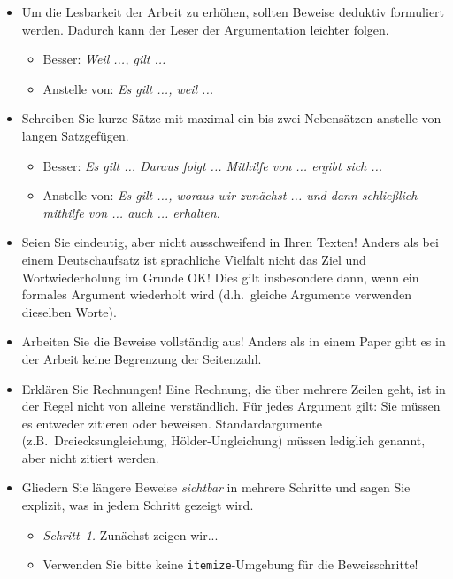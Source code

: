 \documentclass[../template_diplom.tex]{subfiles}
\begin{document}
\begin{itemize}

  \item Um die Lesbarkeit der Arbeit zu erhöhen, sollten Beweise deduktiv formuliert werden. Dadurch kann der Leser der Argumentation leichter folgen.
        \begin{itemize}
          \item Besser: \emph{Weil ..., gilt ...}
          \item Anstelle von: \emph{Es gilt ..., weil ...}
        \end{itemize}

  \item Schreiben Sie kurze Sätze mit maximal ein bis zwei Nebensätzen anstelle von langen Satzgefügen.
        \begin{itemize}
          \item Besser: \emph{Es gilt ... Daraus folgt ... Mithilfe von ... ergibt sich ...}
          \item Anstelle von: \emph{Es gilt ..., woraus wir zunächst ... und dann schließlich mithilfe von ... auch ... erhalten.}
        \end{itemize}

  \item Seien Sie eindeutig, aber nicht ausschweifend in Ihren Texten! Anders als bei einem Deutschaufsatz ist sprachliche Vielfalt nicht das Ziel und Wortwiederholung im Grunde OK! Dies gilt insbesondere dann, wenn ein formales Argument wiederholt wird (d.h.\ gleiche Argumente verwenden dieselben Worte).

  \item Arbeiten Sie die Beweise vollständig aus! Anders als in einem Paper gibt es in der Arbeit keine Begrenzung der Seitenzahl.

  \item Erklären Sie Rechnungen! Eine Rechnung, die über mehrere Zeilen geht, ist in der Regel nicht von alleine verständlich. Für jedes Argument gilt: Sie müssen es entweder zitieren oder beweisen. Standardargumente (z.B.\ Dreiecksungleichung, H\"older-Ungleichung) müssen lediglich genannt, aber nicht zitiert werden.

  \item Gliedern Sie längere Beweise \emph{sichtbar} in mehrere Schritte und sagen Sie explizit, was in jedem Schritt gezeigt wird.
        \begin{itemize}
          \item \emph{Schritt~1.} Zunächst zeigen wir...
          \item Verwenden Sie bitte keine \verb$itemize$-Umgebung für die Beweisschritte!
        \end{itemize}


\end{itemize}
\end{document}
